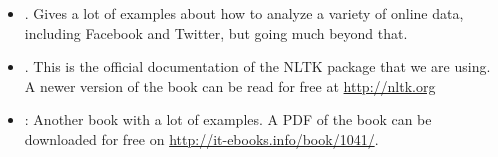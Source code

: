 \documentclass[a4paper,12pt]{report}
\begin{document}
\begin{itemize}
	\item \citealp{Russel2013}. Gives a lot of examples about how to analyze a variety of online data, including Facebook and Twitter, but going much beyond that.
	\item \citealp{Bird2009}. This is the official documentation of the NLTK package that we are using. A newer version of the book can be read for free at \url{http://nltk.org}
	\item \citealp{McKinney2012}: Another book with a lot of examples. A PDF of the book can be downloaded for free on \url{http://it-ebooks.info/book/1041/}.
\end{itemize}







\end{document}

